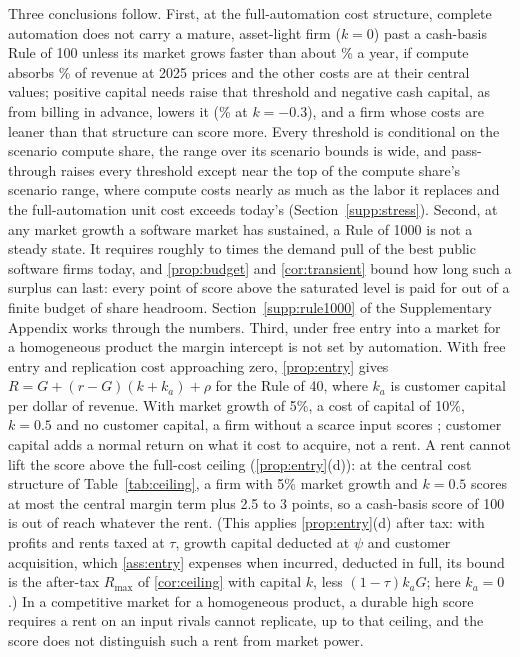 Three conclusions follow. First, at the full-automation cost structure, complete automation does not carry a mature, asset-light firm ($k=0$) past a cash-basis Rule of 100 unless its market grows faster than about \GstarCenOne\% a year, if compute absorbs \CcCen\% of revenue at 2025 prices and the other costs are at their central values; positive capital needs raise that threshold and negative cash capital, as from billing in advance, lowers it (\GstarKdefCen\% at $k=-0.3$), and a firm whose costs are leaner than that structure can score more. Every threshold is conditional on the scenario compute share, the range over its scenario bounds is wide, and pass-through raises every threshold except near the top of the compute share's scenario range, where compute costs nearly as much as the labor it replaces and the full-automation unit cost exceeds today's (Section~\ref{supp:stress}). Second, at any market growth a software market has sustained, a Rule of 1000 is not a steady state. It requires roughly \PullMultLo{} to \PullMultHi{} times the demand pull of the best public software firms today, and \autoref{prop:budget} and \autoref{cor:transient} bound how long such a surplus can last: every point of score above the saturated level is paid for out of a finite budget of share headroom. Section~\ref{supp:rule1000} of the Supplementary Appendix works through the numbers. Third, under free entry into a market for a homogeneous product the margin intercept is not set by automation. With free entry and replication cost approaching zero, \autoref{prop:entry} gives $R=G+(r-G)(k+k_a)+\rho$ for the Rule of 40, where $k_a$ is customer capital per dollar of revenue. With market growth of 5\%, a cost of capital of 10\%, $k=0.5$ and no customer capital, a firm without a scarce input scores \EntryScore; customer capital adds a normal return on what it cost to acquire, not a rent. A rent cannot lift the score above the full-cost ceiling (\autoref{prop:entry}(d)): at the central cost structure of Table~\ref{tab:ceiling}, a firm with 5\% market growth and $k=0.5$ scores at most the central margin term plus 2.5 to 3 points, so a cash-basis score of 100 is out of reach whatever the rent. (This applies \autoref{prop:entry}(d) after tax: with profits and rents taxed at $\tau$, growth capital deducted at $\psi$ and customer acquisition, which \autoref{ass:entry} expenses when incurred, deducted in full, its bound is the after-tax $R_{\max}$ of \autoref{cor:ceiling} with capital $k$, less $(1-\tau)k_aG$; here $k_a=0$.) In a competitive market for a homogeneous product, a durable high score requires a rent on an input rivals cannot replicate, up to that ceiling, and the score does not distinguish such a rent from market power.

